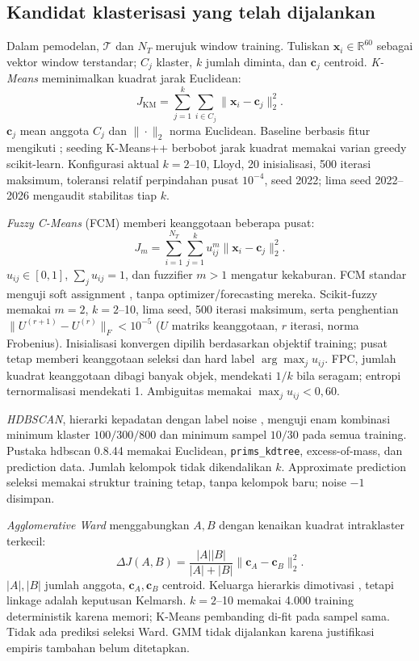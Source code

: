 \subsection{Kandidat klasterisasi yang telah dijalankan}
Dalam pemodelan, $\mathcal T$ dan $N_T$ merujuk window training. Tuliskan $\mathbf x_i\in\mathbb R^{60}$ sebagai vektor window terstandar; $C_j$ klaster, $k$ jumlah diminta, dan $\mathbf c_j$ centroid.
\textit{K-Means} meminimalkan kuadrat jarak Euclidean:
\begin{equation}
J_{\mathrm{KM}}=\sum_{j=1}^{k}\sum_{i\in C_j}\|\mathbf x_i-\mathbf c_j\|_2^2.
\label{eq:kmeans}
\end{equation}
$\mathbf c_j$ mean anggota $C_j$ dan $\|\cdot\|_2$ norma Euclidean. Baseline berbasis fitur mengikuti \cite{bonifati2022,ngophan2025}; seeding K-Means++ berbobot jarak kuadrat memakai varian greedy scikit-learn. Konfigurasi aktual $k=2$--10, Lloyd, 20 inisialisasi, 500 iterasi maksimum, toleransi relatif perpindahan pusat $10^{-4}$, seed 2022; lima seed 2022--2026 mengaudit stabilitas tiap $k$.

\textit{Fuzzy C-Means} (FCM) memberi keanggotaan beberapa pusat:
\begin{equation}
J_m=\sum_{i=1}^{N_T}\sum_{j=1}^{k}u_{ij}^{m}\|\mathbf x_i-\mathbf c_j\|_2^2.
\label{eq:fcm}
\end{equation}
$u_{ij}\in[0,1]$, $\sum_j u_{ij}=1$, dan fuzzifier $m>1$ mengatur kekaburan. FCM standar menguji soft assignment \cite{cai2025}, tanpa optimizer/forecasting mereka. Scikit-fuzzy memakai $m=2$, $k=2$--10, lima seed, 500 iterasi maksimum, serta penghentian $\|U^{(r+1)}-U^{(r)}\|_F<10^{-5}$ ($U$ matriks keanggotaan, $r$ iterasi, norma Frobenius). Inisialisasi konvergen dipilih berdasarkan objektif training; pusat tetap memberi keanggotaan seleksi dan hard label $\arg\max_j u_{ij}$. FPC, jumlah kuadrat keanggotaan dibagi banyak objek, mendekati $1/k$ bila seragam; entropi ternormalisasi mendekati 1. Ambiguitas memakai $\max_j u_{ij}<0,60$.

\textit{HDBSCAN}, hierarki kepadatan dengan label noise \cite{ngophan2025}, menguji enam kombinasi minimum klaster $100/300/800$ dan minimum sampel $10/30$ pada semua training. Pustaka hdbscan 0.8.44 memakai Euclidean, \texttt{prims\_kdtree}, excess-of-mass, dan prediction data. Jumlah kelompok tidak dikendalikan $k$. Approximate prediction seleksi memakai struktur training tetap, tanpa kelompok baru; noise $-1$ disimpan.

\textit{Agglomerative Ward} menggabungkan $A,B$ dengan kenaikan kuadrat intraklaster terkecil:
\begin{equation}
\Delta J(A,B)=\frac{|A||B|}{|A|+|B|}\|\mathbf c_A-\mathbf c_B\|_2^2.
\label{eq:ward}
\end{equation}
$|A|,|B|$ jumlah anggota, $\mathbf c_A,\mathbf c_B$ centroid. Keluarga hierarkis dimotivasi \cite{martipuig2024}, tetapi linkage adalah keputusan Kelmarsh. $k=2$--10 memakai 4.000 training deterministik karena memori; K-Means pembanding di-fit pada sampel sama. Tidak ada prediksi seleksi Ward. GMM tidak dijalankan karena justifikasi empiris tambahan belum ditetapkan.


